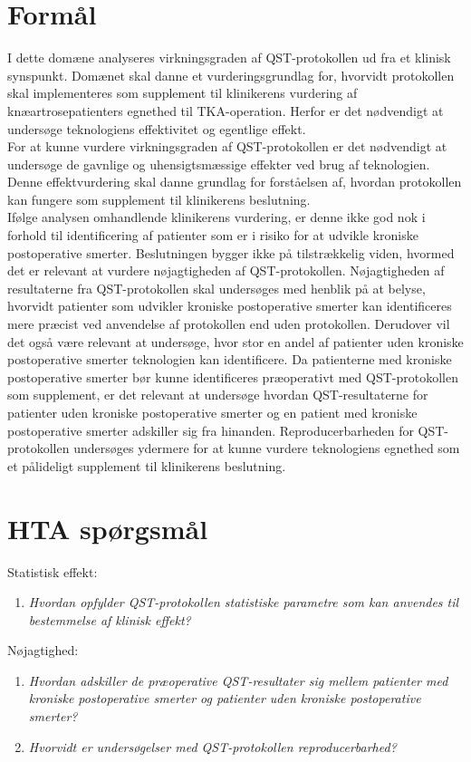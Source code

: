 \section{Formål}
I dette domæne analyseres virkningsgraden af QST-protokollen ud fra et klinisk synspunkt. Domænet skal danne et vurderingsgrundlag for, hvorvidt protokollen skal implementeres som supplement til klinikerens vurdering af knæartrosepatienters egnethed til TKA-operation. Herfor er det nødvendigt at undersøge teknologiens effektivitet og egentlige effekt. \\
For at kunne vurdere virkningsgraden af QST-protokollen er det nødvendigt at undersøge de gavnlige og uhensigtsmæssige effekter ved brug af teknologien. Denne effektvurdering skal danne grundlag for forståelsen af, hvordan protokollen kan fungere som supplement til klinikerens beslutning. \\
Ifølge analysen omhandlende klinikerens vurdering, er denne ikke god nok i forhold til identificering af patienter som er i risiko for at udvikle kroniske postoperative smerter. Beslutningen bygger ikke på tilstrækkelig viden, hvormed det er relevant at vurdere nøjagtigheden af QST-protokollen. Nøjagtigheden af resultaterne fra QST-protokollen skal undersøges med henblik på at belyse, hvorvidt patienter som udvikler kroniske postoperative smerter kan identificeres mere præcist ved anvendelse af protokollen end uden protokollen. Derudover vil det også være relevant at undersøge, hvor stor en andel af patienter uden kroniske postoperative smerter teknologien kan identificere. Da patienterne med kroniske postoperative smerter bør kunne identificeres præoperativt med QST-protokollen som supplement, er det relevant at undersøge hvordan QST-resultaterne for patienter uden kroniske postoperative smerter og en patient med kroniske postoperative smerter adskiller sig fra hinanden. Reproducerbarheden for QST-protokollen undersøges ydermere for at kunne vurdere teknologiens egnethed som et pålideligt supplement til klinikerens beslutning.

\section{HTA spørgsmål}
Statistisk effekt:
\begin{enumerate}
	\item \textit{Hvordan opfylder QST-protokollen statistiske parametre som kan anvendes til bestemmelse af klinisk effekt?} %
\end{enumerate}
Nøjagtighed:
\begin{enumerate}[resume]
	\item \textit{Hvordan adskiller de præoperative QST-resultater sig mellem patienter med kroniske postoperative smerter og patienter uden kroniske postoperative smerter?} %
	\item \textit{Hvorvidt er undersøgelser med QST-protokollen reproducerbarhed?} 
\end{enumerate}


